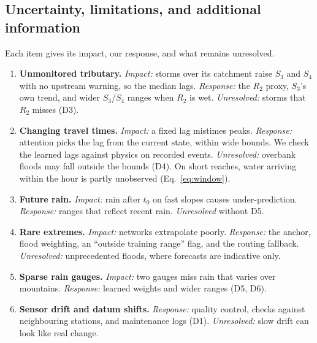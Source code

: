 \documentclass[11pt,a4paper]{article}
\begin{document}
\subsection{Uncertainty, limitations, and additional information}\label{sec:unc}
Each item gives its impact, our response, and what remains unresolved.
\begin{enumerate}[label=\textbf{U\arabic*}, ref=U\arabic*, leftmargin=*]
  \item \textbf{Unmonitored tributary.} \emph{Impact:} storms over its
  catchment raise $S_3$ and $S_4$ with no upstream warning, so the median
  lags. \emph{Response:} the $R_2$ proxy, $S_3$'s own trend, and wider
  $S_3$/$S_4$ ranges when $R_2$ is wet. \emph{Unresolved:} storms that $R_2$
  misses (D3).

  \item \textbf{Changing travel times.} \emph{Impact:} a fixed lag mistimes
  peaks. \emph{Response:} attention picks the lag from the current state,
  within wide bounds. We check the learned lags against physics on recorded
  events. \emph{Unresolved:} overbank floods may fall outside the bounds
  (D4). On short reaches, water arriving within the hour is partly
  unobserved (Eq.~\ref{eq:window}).

  \item \textbf{Future rain.} \emph{Impact:} rain after $t_0$ on fast slopes
  causes under-prediction. \emph{Response:} ranges that reflect recent rain.
  \emph{Unresolved} without D5.

  \item \textbf{Rare extremes.} \emph{Impact:} networks extrapolate poorly.
  \emph{Response:} the anchor, flood weighting, an ``outside training range''
  flag, and the routing fallback. \emph{Unresolved:} unprecedented floods,
  where forecasts are indicative only.

  \item \textbf{Sparse rain gauges.} \emph{Impact:} two gauges miss rain that
  varies over mountains. \emph{Response:} learned weights and wider ranges
  (D5, D6).

  \item \textbf{Sensor drift and datum shifts.} \emph{Response:} quality
  control, checks against neighbouring stations, and maintenance logs (D1).
  \emph{Unresolved:} slow drift can look like real change.


\end{enumerate}
\end{document}
